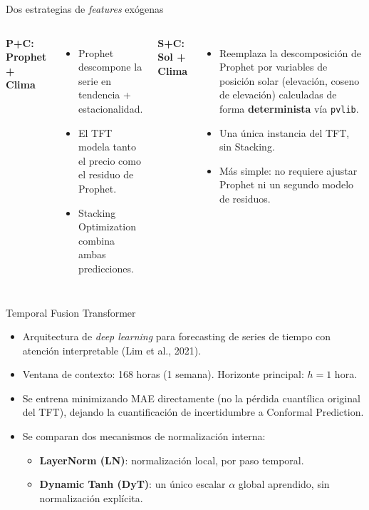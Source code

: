 \documentclass[aspectratio=169]{beamer}
\begin{document}
\begin{frame}{Dos estrategias de \textit{features} exógenas}
    \begin{columns}
        \textbf{P+C: Prophet + Clima}
        \begin{itemize}
            \item Prophet descompone la serie en tendencia + estacionalidad.
            \item El TFT modela tanto el precio como el residuo de Prophet.
            \item Stacking Optimization combina ambas predicciones.
        \end{itemize}
        \textbf{S+C: Sol + Clima}
        \begin{itemize}
            \item Reemplaza la descomposición de Prophet por variables de posición solar (elevación, coseno de elevación) calculadas de forma \textbf{determinista} vía \texttt{pvlib}.
            \item Una única instancia del TFT, sin Stacking.
            \item Más simple: no requiere ajustar Prophet ni un segundo modelo de residuos.
        \end{itemize}
    \end{columns}
\end{frame}

\begin{frame}{Temporal Fusion Transformer}
    \begin{itemize}
        \item Arquitectura de \textit{deep learning} para forecasting de series de tiempo con atención interpretable (Lim et al., 2021).
        \item Ventana de contexto: 168 horas (1 semana). Horizonte principal: $h=1$ hora.
        \item Se entrena minimizando MAE directamente (no la pérdida cuantílica original del TFT), dejando la cuantificación de incertidumbre a Conformal Prediction.
        \item Se comparan dos mecanismos de normalización interna:
        \begin{itemize}
            \item \textbf{LayerNorm (LN)}: normalización local, por paso temporal.
            \item \textbf{Dynamic Tanh (DyT)}: un único escalar $\alpha$ global aprendido, sin normalización explícita.
        \end{itemize}
    \end{itemize}
\end{frame}
\end{document}
